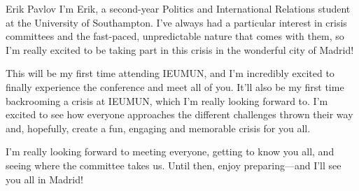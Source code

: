 \begin{chairletter}{Erik Pavlov}
I’m Erik, a second-year Politics and International Relations student at the University of Southampton. I’ve always had a particular interest in crisis committees and the fast-paced, unpredictable nature that comes with them, so I’m really excited to be taking part in this crisis in the wonderful city of Madrid!

This will be my first time attending IEUMUN, and I’m incredibly excited to finally experience the conference and meet all of you. It’ll also be my first time backrooming a crisis at IEUMUN, which I’m really looking forward to. I’m excited to see how everyone approaches the different challenges thrown their way and, hopefully, create a fun, engaging and memorable crisis for you all.

I’m really looking forward to meeting everyone, getting to know you all, and seeing where the committee takes us. Until then, enjoy preparing—and I’ll see you all in Madrid!

\end{chairletter}

